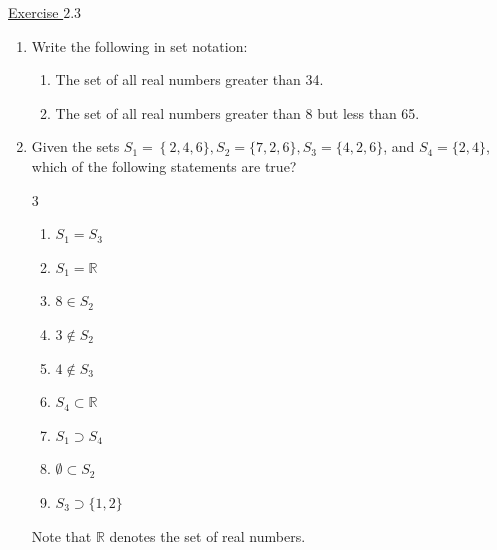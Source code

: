 \underline{Exercise $2.3$} 
\begin{enumerate}

\item Write the following in set notation:
\begin{enumerate}
	\item The set of all real numbers greater than 34.
	\item The set of all real numbers greater than 8 but less than 65.
\end{enumerate}
 
\item Given the sets $S_1=\left\{2,4, 6\}, S_2=\{7,2,6\}, S_3=\{4,2,6\}\right.$, and $S_4=\{2,4\}$, which of the following statements are true?
\begin{multicols}{3}
\begin{enumerate}\renewcommand{\labelenumi}{\alph{enumi})}
\item $S_1=S_3$
\item $S_1=\mathbb{R}$
\item $8 \in S_2$
\item $3 \notin S_2$
\item $4 \notin S_3$
\item $S_4 \subset\mathbb{R}$
\item $ S_1 \supset S_4$
\item $ \emptyset \subset S_2$
\item $S_3 \supset \{1,2\}$
\end{enumerate}
\end{multicols}
Note that $\mathbb{R}$ denotes the set of real numbers.
\end{enumerate}
